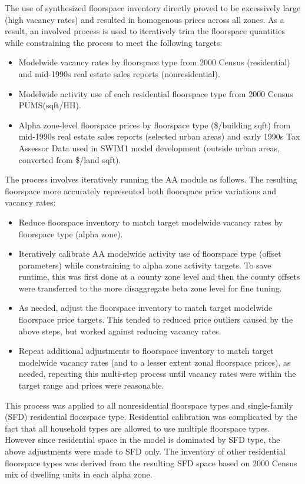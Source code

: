The use of synthesized floorspace inventory directly proved to be excessively large (high vacancy rates) and resulted in homogenous prices across all zones. As a result, an involved process is used to iteratively trim the floorspace quantities while constraining the process to meet the following targets:
\begin{itemize}
\item Modelwide vacancy rates by floorspace type from 2000 Census (residential) and mid-1990s real estate sales reports (nonresidential).
\item Modelwide activity use of each residential floorspace type from 2000 Census PUMS(sqft/HH).
\item Alpha zone-level floorspace prices by floorspace type (\$/building sqft) from mid-1990s real estate sales reports (selected urban areas) and early 1990s Tax Assessor Data used in SWIM1 model development (outside urban areas, converted from \$/land sqft).
\end{itemize}

The process involves iteratively running the AA module as follows. The resulting floorspace more accurately represented both floorspace price variations and vacancy rates: 
\begin{itemize}
\item Reduce floorspace inventory to match target modelwide vacancy rates by floorspace type (alpha zone).
\item Iteratively calibrate AA modelwide activity use of floorspace type (offset parameters) while constraining to alpha zone activity targets. To save runtime, this was first done at a county zone level and then the county offsets were transferred to the more disaggregate beta zone level for fine tuning.
\item As needed, adjust the floorspace inventory to match target modelwide floorspace price targets. This tended to reduced price outliers caused by the above steps, but worked against reducing vacancy rates.
\item Repeat additional adjustments to floorspace inventory to match target modelwide vacancy rates (and to a lesser extent zonal floorspace prices), as needed, repeating this multi-step process until vacancy rates were within the target range and prices were reasonable.
\end{itemize}

This process was applied to all nonresidential floorspace types and single-family (SFD) residential floorspace type. Residential calibration was complicated by the fact that all household types are allowed to use multiple floorspace types. However since residential space in the model is dominated by SFD type, the above adjustments were made to SFD only. The inventory of other residential floorspace types was derived from the resulting SFD space based on 2000 Census mix of dwelling units in each alpha zone.

